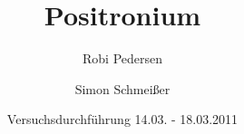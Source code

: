 \documentclass[a4paper,oneside]{scrartcl} %
\title{Positronium}
\author{Robi Pedersen \and Simon Schmeißer}
\date{Versuchsdurchführung 14.03. - 18.03.2011}
\begin{document}
\begin{titlepage}
  \maketitle
  \vfill
  \thispagestyle{empty}
\end{titlepage}

\tableofcontents
\clearpage






\clearpage


\clearpage

% 
%
\end{document}
